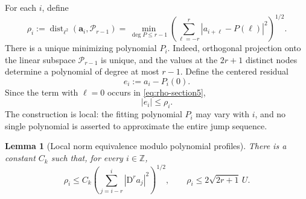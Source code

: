 \documentclass[11pt]{amsart}
\theoremstyle{plain}
\newtheorem{lemma}[theorem]{Lemma}
\theoremstyle{definition}
\theoremstyle{remark}
\numberwithin{equation}{section}
\theoremstyle{plain}
\begin{document}
For each $i$, define
\begin{equation}\label{eq:rho-section5}
	\rho_i
	:=\operatorname{dist}_{\ell^2}(\mathbf a_i,\mathcal P_{r-1})
	=\min_{\deg P\le r-1}
	\left(\sum_{\ell=-r}^{r}|a_{i+\ell}-P(\ell)|^2\right)^{1/2}.
\end{equation}
There is a unique minimizing polynomial $P_i$.  Indeed, orthogonal
projection onto the linear subspace $\mathcal P_{r-1}$ is unique, and the
values at the $2r+1$ distinct nodes determine a polynomial of degree at most
$r-1$.  Define the centered residual
\begin{equation}\label{eq:centered-polynomial-residual}
	e_i:=a_i-P_i(0).
\end{equation}
Since the term with $\ell=0$ occurs in
\eqref{eq:rho-section5},
\begin{equation}\label{eq:centered-residual-bounded-by-rho}
	|e_i|\le\rho_i.
\end{equation}
The construction is local: the fitting polynomial $P_i$ may vary with $i$,
and no single polynomial is asserted to approximate the entire jump
sequence.

\begin{lemma}[Local norm equivalence modulo polynomial profiles]
	\label{lem:local-discrete-BH}
	There is a constant $C_k$ such that, for every $i\in\mathbb Z$,
	\begin{equation}\label{eq:local-discrete-BH}
		\rho_i
		\le C_k
		\left(\sum_{j=i-r}^{i}|\mathrm D^ra_j|^2\right)^{1/2},
		\qquad
		\rho_i\le2\sqrt{2r+1}\,U.
	\end{equation}
\end{lemma}
\end{document}
